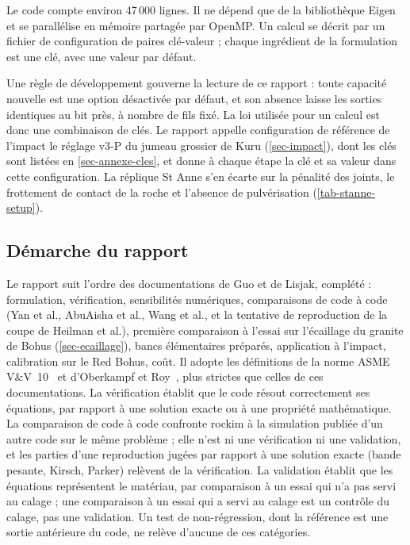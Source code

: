 Le code compte environ 47\,000 lignes. Il ne dépend que de la bibliothèque Eigen et se parallélise en mémoire partagée par OpenMP. Un calcul se décrit par un fichier de configuration de paires clé-valeur ; chaque ingrédient de la formulation est une clé, avec une valeur par défaut.

Une règle de développement gouverne la lecture de ce rapport : toute capacité nouvelle est une option désactivée par défaut, et son absence laisse les sorties identiques au bit près, à nombre de fils fixé. La loi utilisée pour un calcul est donc une combinaison de clés. Le rapport appelle configuration de référence de l'impact le réglage v3-P du jumeau grossier de Kuru (\cref{sec-impact}), dont les clés sont listées en \cref{sec-annexe-cles}, et donne à chaque étape la clé et sa valeur dans cette configuration. La réplique St Anne s'en écarte sur la pénalité des joints, le frottement de contact de la roche et l'absence de pulvérisation (\cref{tab-stanne-setup}).

\subsection{Démarche du rapport}

Le rapport suit l'ordre des documentations de Guo et de Lisjak, complété : formulation, vérification, sensibilités numériques, comparaisons de code à code (Yan et al., AbuAisha et al., Wang et al., et la tentative de reproduction de la coupe de Heilman et al.), première comparaison à l'essai sur l'écaillage du granite de Bohus (\cref{sec-ecaillage}), bancs élémentaires préparés, application à l'impact, calibration sur le Red Bohus, coût. Il adopte les définitions de la norme ASME V\&V~10~\cite{asme2019vv10} et d'Oberkampf et Roy~\cite{oberkampf2010vv}, plus strictes que celles de ces documentations. La vérification établit que le code résout correctement ses équations, par rapport à une solution exacte ou à une propriété mathématique. La comparaison de code à code confronte rockim à la simulation publiée d'un autre code sur le même problème ; elle n'est ni une vérification ni une validation, et les parties d'une reproduction jugées par rapport à une solution exacte (bande pesante, Kirsch, Parker) relèvent de la vérification. La validation établit que les équations représentent le matériau, par comparaison à un essai qui n'a pas servi au calage ; une comparaison à un essai qui a servi au calage est un contrôle du calage, pas une validation. Un test de non-régression, dont la référence est une sortie antérieure du code, ne relève d'aucune de ces catégories.

